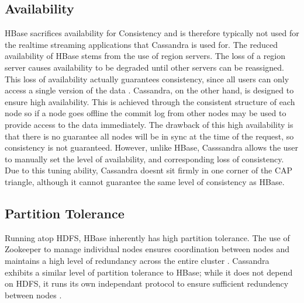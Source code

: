 \documentclass[10pt]{article}
\begin{document}
\subsection{Availability}
HBase sacrifices availability for Consistency and is therefore typically not used for the realtime streaming applications that Cassandra is used for. The reduced availability of HBase stems from the use of region servers. The loss of a region server causes availability to be degraded until other servers can be reassigned. This loss of availability actually guarantees consistency, since all users can only access a single version of the data \cite{6885425}. Cassandra, on the other hand, is designed to ensure high availability. This is achieved through the consistent structure of each node so if a node goes offline the commit log from other nodes may be used to provide access to the data immediately. The drawback of this high availability is that there is no guarantee all nodes will be in sync at the time of the request, so consistency is not guaranteed. However, unlike HBase, Casssandra allows the user to manually set the level of availability, and corresponding loss of consistency. Due to this tuning ability, Cassandra doesnt sit firmly in one corner of the CAP triangle, although it cannot guarantee the same level of consistency as HBase.

\subsection{Partition Tolerance}
Running atop HDFS, HBase inherently has high partition tolerance. The use of Zookeeper to manage individual nodes ensures coordination between nodes and maintains a high level of redundancy across the entire cluster \cite{6846507}. Cassandra exhibits a similar level of partition tolerance to HBase; while it does not depend on HDFS, it runs its own independant protocol to ensure sufficient redundency between nodes \cite{DBLP:journals/corr/RahmanTNGV15}.
\end{document}

